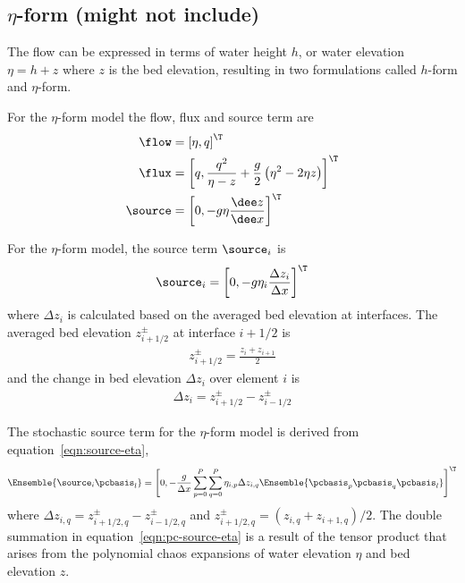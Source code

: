 \subsection{$\eta$-form (might not include)}
The flow can be expressed in terms of water height $h$, or water elevation $\eta = h + z$ where $z$ is the bed elevation, resulting in two formulations called $h$-form and $\eta$-form.

For the $\eta$-form model the flow, flux and source term are \citep{liang-borthwick2009}
\begin{subequations}
\begin{align}
    \flow &= \left[ \eta, q \right]^\T \\
    \flux &= \left[ q, \frac{q^2}{\eta - z} +
            \frac{g}{2}\left(\eta^2 - 2\eta z \right) \right]^\T \\
    \source &= \left[ 0, -g \eta \frac{\dee z}{\dee x} \right]^\T
\end{align}
\end{subequations}

For the $\eta$-form model, the source term $\source_i$ is \citep{liang-borthwick2009}
\begin{align}
    \source_i = \left[ 0, -g \eta_i \frac{\Delta z_i}{\Delta x} \right]^\T \label{eqn:source-eta}
\end{align}
where $\Delta z_i$ is calculated based on the averaged bed elevation at interfaces.  The averaged bed elevation $z_{i+1/2}^\pm$ at interface $i+1/2$ is
\begin{align}
z_{i+1/2}^\pm = \frac{z_i + z_{i+1}}{2} \label{eqn:z-interface}
\end{align}
and the change in bed elevation $\Delta z_i$ over element $i$ is
\begin{align}
    \Delta z_i = z_{i+1/2}^\pm - z_{i-1/2}^\pm \label{eqn:delta-z}
\end{align}

The stochastic source term for the $\eta$-form model is derived from equation~\eqref{eqn:source-eta},
\begin{align}
    \Ensemble{\source_i \pcbasis_l} = \left[ 0,
    -\frac{g}{\Delta x} \sum_{p=0}^P \sum_{q=0}^P \eta_{i,p}
    \Delta z_{i,q}
    \Ensemble{\pcbasis_p \pcbasis_q \pcbasis_l}
    \right]^\T \label{eqn:pc-source-eta}
\end{align}
where $\Delta z_{i,q} = z_{i+1/2,q}^\pm - z_{i-1/2,q}^\pm$ and $z_{i+1/2,q}^\pm = (z_{i,q}+z_{i+1,q})/2$.
The double summation in equation~\eqref{eqn:pc-source-eta} is a result of the tensor product that arises from the polynomial chaos expansions of water elevation $\eta$ and bed elevation $z$.

